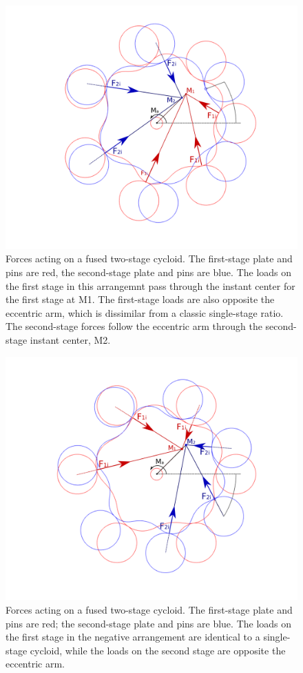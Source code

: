 \begin{figure}[t]
	\centering
	\includegraphics[width=0.80\linewidth]{fig/two_stage_loads_pos}
   \caption{Forces acting on a fused two-stage cycloid. The first-stage plate and pins are red, the second-stage plate and pins are blue. The loads on the first stage in this arrangemnt pass through the instant center for the first stage at M1. The first-stage loads are also opposite the eccentric arm, which is dissimilar from a classic single-stage ratio. The second-stage forces follow the eccentric arm through the second-stage instant center, M2. }
   \label{fig:two_stage_force_pos}
\end{figure}

\begin{figure}[t]
	\centering
	\includegraphics[width=0.80\linewidth]{fig/two_stage_loads_neg}
   \caption{Forces acting on a fused two-stage cycloid. The first-stage plate and pins are red; the second-stage plate and pins are blue. The loads on the first stage in the negative arrangement are identical to a single-stage cycloid, while the loads on the second stage are opposite the eccentric arm.}
   \label{fig:two_stage_force_neg}
\end{figure}

